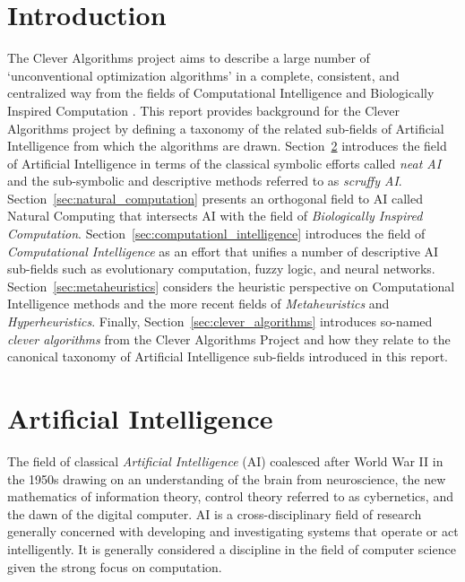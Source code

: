 \documentclass[a4paper, 11pt]{article}
\begin{document}
\section{Introduction}
\label{sec:introduction}
The Clever Algorithms project aims to describe a large number of `unconventional optimization algorithms' in a complete, consistent, and centralized way from the fields of Computational Intelligence and Biologically Inspired Computation \cite{Brownlee2010}.
This report provides background for the Clever Algorithms project by defining a taxonomy of the related sub-fields of Artificial Intelligence from which the algorithms are drawn.
Section~\ref{sec:artificial_intelligence} introduces the field of Artificial Intelligence in terms of the classical symbolic efforts called \emph{neat AI} and the sub-symbolic and descriptive methods referred to as \emph{scruffy AI}. Section~\ref{sec:natural_computation} presents an orthogonal field to AI called Natural Computing that intersects AI with the field of \emph{Biologically Inspired Computation}. Section~\ref{sec:computationl_intelligence} introduces the field of \emph{Computational Intelligence} as an effort that unifies a number of descriptive AI sub-fields such as evolutionary computation, fuzzy logic, and neural networks. Section~\ref{sec:metaheuristics} considers the heuristic perspective on Computational Intelligence methods and the more recent fields of \emph{Metaheuristics} and \emph{Hyperheuristics}. Finally, Section~\ref{sec:clever_algorithms} introduces so-named \emph{clever algorithms} from the Clever Algorithms Project and how they relate to the canonical taxonomy of Artificial Intelligence sub-fields introduced in this report.

% 
% 
\section{Artificial Intelligence}
\label{sec:artificial_intelligence}
The field of classical \emph{Artificial Intelligence} (AI) coalesced after World War II in the 1950s drawing on an understanding of the brain from neuroscience, the new mathematics of information theory, control theory referred to as cybernetics, and the dawn of the digital computer. AI is a cross-disciplinary field of research generally concerned with developing and investigating systems that operate or act intelligently. It is generally considered a discipline in the field of computer science given the strong focus on computation.
\end{document}
